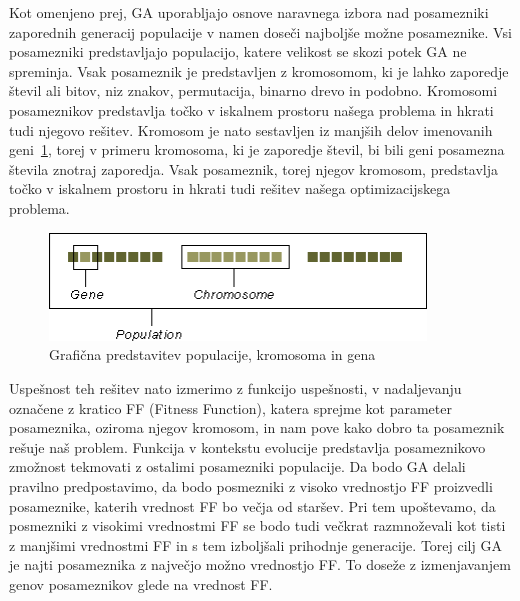 \documentclass[a4paper, 12pt]{book}
\begin{document}
Kot omenjeno prej, GA uporabljajo osnove naravnega izbora nad posamezniki zaporednih generacij populacije v namen doseči najboljše možne posameznike. Vsi posamezniki predstavljajo populacijo, katere velikost se skozi potek GA ne spreminja. Vsak posameznik je predstavljen z kromosomom, ki je lahko zaporedje števil ali bitov, niz znakov, permutacija, binarno drevo in podobno. Kromosomi posameznikov predstavlja točko v iskalnem prostoru našega problema in hkrati tudi njegovo rešitev. Kromosom je nato sestavljen iz manjših delov imenovanih geni~\ref{pic1}, torej v primeru kromosoma, ki je zaporedje števil, bi bili geni posamezna števila znotraj zaporedja. Vsak posameznik, torej njegov kromosom, predstavlja točko v iskalnem prostoru in hkrati tudi rešitev našega optimizacijskega problema.\\ 

\begin{figure}[H]
\begin{center}
\includegraphics[width=10cm]{gene.png}
\end{center}
\caption{Grafična predstavitev populacije, kromosoma in gena}
\label{pic1}
\end{figure}

Uspešnost teh rešitev nato izmerimo z funkcijo uspešnosti, v nadaljevanju označene z kratico FF (Fitness Function), katera sprejme kot parameter posameznika, oziroma njegov kromosom, in nam pove kako dobro ta posameznik rešuje naš problem. Funkcija v kontekstu evolucije predstavlja posameznikovo zmožnost tekmovati z ostalimi posamezniki populacije. Da bodo GA delali pravilno predpostavimo, da bodo posmezniki z visoko vrednostjo FF proizvedli posameznike, katerih vrednost FF bo večja od staršev. Pri tem upoštevamo, da posmezniki z visokimi vrednostmi FF se bodo tudi večkrat razmnoževali kot tisti z manjšimi vrednostmi FF in s tem izboljšali prihodnje generacije. Torej cilj GA je najti posameznika z največjo možno vrednostjo FF. To doseže z izmenjavanjem genov posameznikov glede na vrednost FF.
\end{document}
